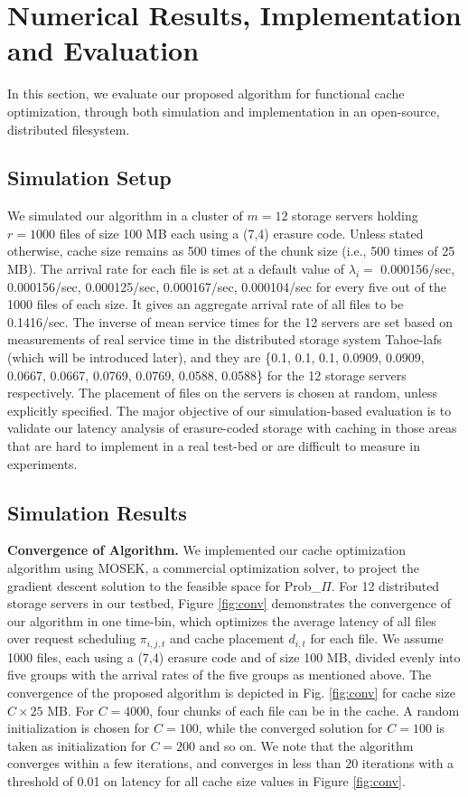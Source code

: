 \section{Numerical Results, Implementation and Evaluation}

In this section, we evaluate our proposed algorithm for functional cache optimization, through both simulation and implementation in an open-source, distributed filesystem.

\subsection{Simulation Setup}
We simulated our algorithm in a cluster of $m=12$ storage servers  holding $r=1000$ files of size 100 MB each using a (7,4) erasure code. Unless stated otherwise, cache size remains as 500 times of the chunk size (i.e., 500 times of 25 MB). The arrival rate for each file is set at a default value of $\lambda_i=$ 0.000156/sec,  0.000156/sec, 0.000125/sec, 0.000167/sec, 0.000104/sec for every five out of the 1000 files of each size. It gives an aggregate arrival rate of all files to be 0.1416/sec. The inverse of mean service times  for the 12 servers are set based on measurements of real service time in the distributed storage system Tahoe-lafs (which will be introduced later), and they are \{0.1, 0.1, 0.1, 0.0909, 0.0909, 0.0667, 0.0667, 0.0769, 0.0769, 0.0588, 0.0588\} for the 12 storage servers respectively. The placement of files on the servers is chosen at random, unless explicitly specified. The major objective of our simulation-based evaluation is to validate our latency analysis of erasure-coded storage with caching in those areas that are hard to implement in a real test-bed or are difficult to measure in experiments.
\subsection{Simulation Results}

{\bf Convergence of Algorithm.} We implemented our cache optimization algorithm using MOSEK, a commercial optimization solver, to project the gradient descent solution to the feasible space for  Prob\_$\Pi$. For 12 distributed storage servers in our testbed, Figure \ref{fig:conv} demonstrates the convergence of our algorithm in one time-bin, which optimizes the average latency of all files over request scheduling $\pi_{i,j,t}$ and cache placement $d_{i,t}$ for each file. We assume 1000 files, each using a (7,4) erasure code and of size 100 MB, divided evenly into five groups with the arrival rates of the five groups as mentioned above. The convergence of the proposed  algorithm is depicted in Fig. \ref{fig:conv} for cache size $C\times 25$ MB. For $C=4000$, four chunks of each file can be in the cache. A random initialization is chosen for $C=100$, while the converged solution for $C=100$ is taken as initialization for $C=200$ and so on. We note that the algorithm converges within a few iterations, and converges in less than 20 iterations with a threshold of 0.01 on latency for all cache size values in Figure \ref{fig:conv}.

